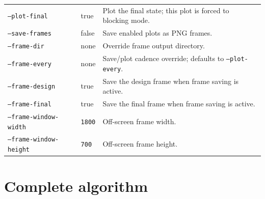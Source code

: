 \documentclass[11pt]{article}
\begin{document}
\begin{longtable}{>{\raggedright\arraybackslash}p{}
                  >{\raggedright\arraybackslash}p{}
                  >{\raggedright\arraybackslash}p{}}
\texttt{--plot-final} & true & Plot the final state; this plot is forced to blocking mode. \\
\texttt{--save-frames} & false & Save enabled plots as PNG frames. \\
\texttt{--frame-dir} & none & Override frame output directory. \\
\texttt{--frame-every} & none & Save/plot cadence override; defaults to \texttt{--plot-every}. \\
\texttt{--frame-design} & true & Save the design frame when frame saving is active. \\
\texttt{--frame-final} & true & Save the final frame when frame saving is active. \\
\texttt{--frame-window-width} & \texttt{1800} & Off-screen frame width. \\
\texttt{--frame-window-height} & \texttt{700} & Off-screen frame height. \\
\end{longtable}
\endgroup

\section{Complete algorithm}
\end{document}

